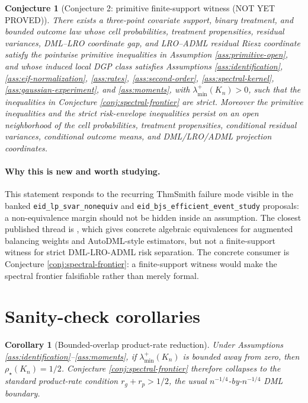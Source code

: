 \documentclass[11pt]{article}
\theoremstyle{definition}
\theoremstyle{plain}
\newtheorem{conjecture}{Conjecture}
\newtheorem{corollary}{Corollary}
\theoremstyle{remark}
\begin{document}
\begin{conjecture}[Conjecture 2: primitive finite-support witness (NOT YET PROVED)]\label{conj:witness}
There exists a three-point covariate support, binary treatment, and bounded
outcome law whose cell probabilities, treatment propensities, residual
variances, DML--LRO coordinate gap, and LRO--ADML residual Riesz coordinate
satisfy the pointwise primitive
inequalities in Assumption \ref{ass:primitive-open}, and whose induced local
DGP class satisfies Assumptions \ref{ass:identification},
\ref{ass:eif-normalization}, \ref{ass:rates}, \ref{ass:second-order},
\ref{ass:spectral-kernel}, \ref{ass:gaussian-experiment}, and
\ref{ass:moments}, with
\(\lambda_{\min}^+(K_n)>0\), such that the inequalities in Conjecture
\ref{conj:spectral-frontier} are strict.  Moreover the primitive inequalities
and the strict risk-envelope inequalities persist on an open neighborhood of
the cell probabilities, treatment propensities, conditional residual variances,
conditional outcome means, and DML/LRO/ADML projection coordinates.
\end{conjecture}
\paragraph{Why this is new and worth studying.}
This statement responds to the recurring ThmSmith failure mode visible in the
banked \texttt{eid\_lp\_svar\_nonequiv} and
\texttt{eid\_bjs\_efficient\_event\_study} proposals: a non-equivalence margin
should not be hidden inside an assumption.  The closest published thread is
\citet{BrunsSmithDukesFellerOgburn2024ABW}, which gives concrete algebraic
equivalences for augmented balancing weights and AutoDML-style estimators, but
not a finite-support witness for strict DML-LRO-ADML risk separation.  The
concrete consumer is Conjecture \ref{conj:spectral-frontier}: a finite-support
witness would make the spectral frontier falsifiable rather than merely formal.

\section{Sanity-check corollaries}
\begin{corollary}[Bounded-overlap product-rate reduction]\label{cor:product-rate}
Under Assumptions \ref{ass:identification}--\ref{ass:moments}, if
\(\lambda_{\min}^+(K_n)\) is bounded away from zero, then
\(\rho_\star(K_n)=1/2\).  Conjecture \ref{conj:spectral-frontier} therefore
collapses to the standard product-rate condition \(r_g+r_p>1/2\), the usual
\(n^{-1/4}\)-by-\(n^{-1/4}\) DML boundary.
\end{corollary}
\end{document}
